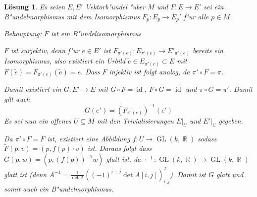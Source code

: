 \documentclass[paper=A4, twoside, chapterprefix=true, bibliography=totoc, headsepline]{scrbook}
\DeclareMathOperator{\R}{\mathbb{R}}
\DeclareMathOperator{\GL}{GL}       %
\DeclareMathOperator{\Id}{id}       %
\newcommand{\X}{\times}
\theoremstyle{plain}
\theoremstyle{nonumberplain}
\theoremstyle{empty}
\theoremstyle{break}
\newtheorem{Loes}{L\"osung}
\begin{document}
\begin{Loes}
Es seien $E, E'$ Vektorb"undel "uber $M$ und $F: E \to E'$ sei ein B"undelmorphismus mit dem Isomorphismus $F_p: E_p \to E_p'$ f"ur alle $p \in M$.

\emph{Behauptung:} $F$ ist ein B"undelisomorphismus

$F$ ist surjektiv, denn f"ur $e \in E'$ ist $F_{\pi'(e)}: E_{\pi'(e)} \to E'_{\pi'(e)}$ bereits ein Isomorphismus, also existiert ein Urbild $\tilde e \in E_{\pi'(e)} \subset E$ mit $F(\tilde e) = F_{\pi'(e)}(\tilde e) = e$. Dass $F$ injektiv ist folgt analog, da $\pi' \circ F = \pi$.

Damit existiert ein $G: E' \to E$ mit $G \circ F = \Id$, $F \circ G = \Id$ und $\pi \circ G = \pi'$. Damit gilt auch
	\[ G(e') = (F_{\pi'(e)})^{-1}(e') \]
Es sei nun ein offenes $U  \subseteq M$ mit den Trivialisierungen $E|_U$ und $E'|_U$ gegeben.
\begin{center}\end{center}
Da $\pi' \circ F = F$ ist, existiert eine Abbildung $f: U \to \GL(k, \R)$ sodass $\tilde F(p,v) = (p, f(p) \cdot v)$ ist. Daraus folgt dass $\tilde G(p,w) = (p, (f(p))^{-1}w)$ glatt ist, da $\cdot^{-1}: \GL(k,\R) \to \GL(k, \R)$ glatt ist (denn $A^{-1} = \frac{1}{\det A}((-1)^{i+j} \det A[i,j])_{i,j}^T$). Damit ist $G$ glatt und somit auch ein B"undelmorphismus.
\end{Loes}
\end{document}
